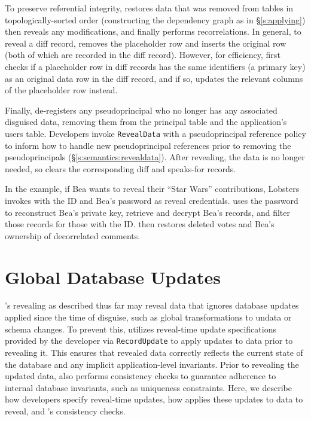 
%
To preserve referential integrity, \sys restores
\xxed data that was removed from tables in topologically-sorted order (constructing the dependency graph as in \S\ref{s:applying})
%
\sys then reveals any modifications, and finally performs recorrelations. 
%
In general, to reveal a diff record, \sys removes the placeholder row
and inserts the original row (both of which are recorded in the diff record).
%
However, for efficiency, \sys first checks if a placeholder row in diff records
has the same identifiers (\eg a primary key) as an original data row in the diff
record, and if so, updates the relevant columns of the placeholder row instead.
%

%
Finally, \sys de-registers any pseudoprincipal who no longer has any associated
disguised data, removing them from the principal table and the application's
users table.
%
Developers invoke \texttt{RevealData} with a pseudoprincipal reference policy to
inform \sys how to handle new pseudoprincipal references prior to removing the
pseudoprincipals (\S\ref{s:semantics:revealdata}).
%
After revealing, the \xxed data is no longer needed, so \sys clears the
corresponding diff and speaks-for records.
%

%
In the example, if Bea wants to reveal their ``Star Wars'' contributions,
Lobsters invokes \sys with the \xx ID and Bea's password as reveal credentials.
%
\sys uses the password to reconstruct Bea's private key, retrieve and decrypt
Bea's records, and filter those records for those with the \xx ID.
%
\sys then restores deleted votes and Bea's ownership of
decorrelated comments.
%

\section{Global Database Updates}
\label{s:design:updates}
\sys's revealing as described thus far may reveal data that ignores
database updates applied since the time of disguise, such as global
transformations to un\xxed data or schema changes.
%
To prevent this, \sys utilizes reveal-time update specifications provided by the
developer via \texttt{RecordUpdate} to apply updates to \xxed data prior to
revealing it. This ensures that revealed data correctly reflects the current
state of the database and any implicit application-level invariants.
%
Prior to revealing the updated data, \sys also performs consistency checks
to guarantee adherence to internal database invariants, such as uniqueness
constraints.
%
Here, we describe how developers specify reveal-time updates, how \sys applies
these updates to data to reveal, and \sys's consistency checks.

